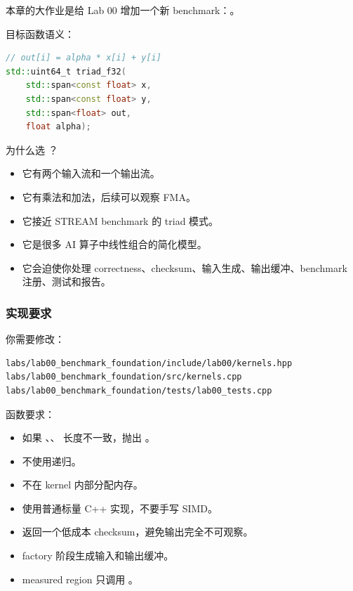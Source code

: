本章的大作业是给 Lab 00 增加一个新 benchmark：。

目标函数语义：

\begin{lstlisting}[language=C++]
// out[i] = alpha * x[i] + y[i]
std::uint64_t triad_f32(
    std::span<const float> x,
    std::span<const float> y,
    std::span<float> out,
    float alpha);
\end{lstlisting}

为什么选 ？

\begin{itemize}
  \item 它有两个输入流和一个输出流。
  \item 它有乘法和加法，后续可以观察 FMA。
  \item 它接近 STREAM benchmark 的 triad 模式。
  \item 它是很多 AI 算子中线性组合的简化模型。
  \item 它会迫使你处理 correctness、checksum、输入生成、输出缓冲、benchmark 注册、测试和报告。
\end{itemize}

\subsubsection{实现要求}

你需要修改：

\begin{lstlisting}
labs/lab00_benchmark_foundation/include/lab00/kernels.hpp
labs/lab00_benchmark_foundation/src/kernels.cpp
labs/lab00_benchmark_foundation/tests/lab00_tests.cpp
\end{lstlisting}

函数要求：

\begin{itemize}
  \item 如果 、、 长度不一致，抛出 。
  \item 不使用递归。
  \item 不在 kernel 内部分配内存。
  \item 使用普通标量 C++ 实现，不要手写 SIMD。
  \item 返回一个低成本 checksum，避免输出完全不可观察。
  \item factory 阶段生成输入和输出缓冲。
  \item measured region 只调用 。
\end{itemize}

